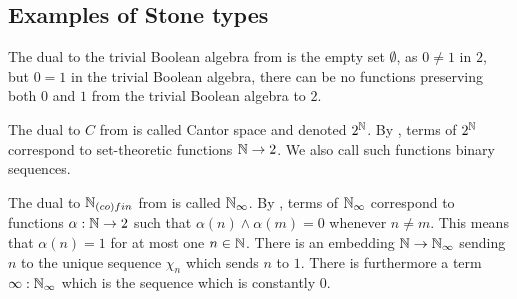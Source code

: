 \subsection{Examples of Stone types}
\begin{example}\label{ExampleBAunderEmpty}
  The dual to the trivial Boolean algebra from  is the empty set 
  $\emptyset$, 
  as $0\neq 1$ in $2$, but $0=1$ in the trivial Boolean algebra, 
  there can be no functions preserving both $0$ and $1$ 
  from the trivial Boolean algebra to $2$. 
\end{example}
\begin{example}
  The dual to $C$ from  is called Cantor space 
  and denoted $2^{\mathbb{N}}$. 
  By , terms of $2^{\mathbb{N}}$ 
  correspond to set-theoretic functions $\mathbb{N} \to 2$. 
  We also call such functions binary sequences. 
\end{example}
\begin{example}
  The dual to $\mathbb{N}_{(co)fin}$ from  is called 
  $\mathbb{N}_\infty$. By , terms of $\mathbb{N}_\infty$ 
  correspond to functions $\alpha: \mathbb{N} \to 2$ such that $\alpha(n) \wedge \alpha(m) = 0$ 
  whenever $n \neq m$. This means that $\alpha(n) = 1$ for at most one $n\in\mathbb{N}$. 
  There is an embedding $\mathbb{N} \to \mathbb{N}_\infty$ sending $n$ to the unique sequence $\chi_n$
  which sends $n$ to $1$. 
  There is furthermore a term $\infty:\mathbb{N}_\infty$ which is the sequence which is constantly $0$. 
\end{example}

